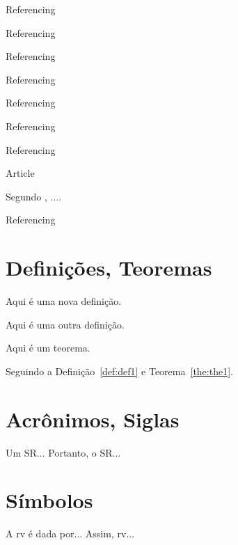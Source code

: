 \begin{alineas}
  \item Referencing 
  \item Referencing 
  \item Referencing 
  \item Referencing 
  \item Referencing 
  \item Referencing 
  \item Referencing 
  \item Article \cite{braida2015transforming}
  \item Segundo , ....
  \item Referencing   
\end{alineas}



\section{Definições, Teoremas}

\begin{definition}\label{def:def1}
  Aqui é uma nova definição.
\end{definition}

\begin{definition}[Título] \label{def:def2}
  Aqui é uma outra definição.
\end{definition}

\begin{theorem}\label{the:the1}
  Aqui é um teorema.
\end{theorem}

Seguindo a Definição~\ref{def:def1} e Teorema~\ref{the:the1}.



\section{Acrônimos, Siglas}
  Um \ac{SR}... Portanto, o \ac{SR}...


\section{Símbolos}
  A \ac{rv} é dada por... Assim, \ac{rv}...